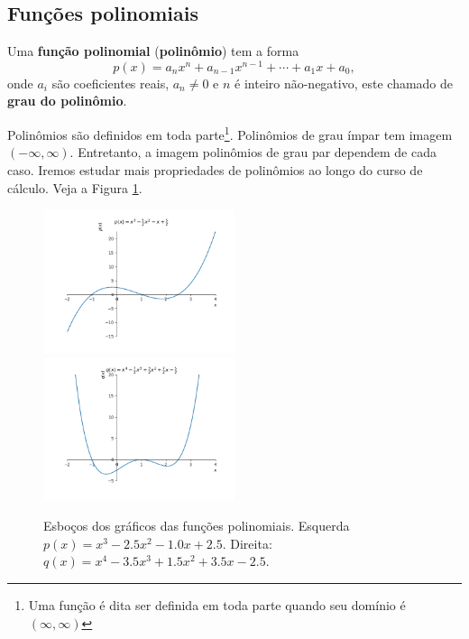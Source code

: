 \subsection{Funções polinomiais}

Uma {\bf função polinomial} ({\bf polinômio}) tem a forma
\begin{equation}
  p(x) = a_nx^n + a_{n-1}x^{n-1} + \cdots + a_1x + a_0,
\end{equation}
onde $a_i$ são coeficientes reais, $a_n\neq 0$ e $n$ é inteiro não-negativo, este chamado de {\bf grau do polinômio}.

Polinômios são definidos em toda parte\footnote{Uma função é dita ser definida em toda parte quando seu domínio é $(\infty, \infty)$}. Polinômios de grau ímpar tem imagem $(-\infty, \infty)$. Entretanto, a imagem polinômios de grau par dependem de cada caso. Iremos estudar mais propriedades de polinômios ao longo do curso de cálculo. Veja a Figura \ref{fig:poli_graficos}.

\begin{figure}[H]
  \centering
  \includegraphics[width=0.5\textwidth]{./cap_funcao/dados/fig_poli_graficos/fig_poli_impar}~
    \includegraphics[width=0.5\textwidth]{./cap_funcao/dados/fig_poli_graficos/fig_poli_par}
  \caption{Esboços dos gráficos das funções polinomiais. Esquerda $p(x) = x^{3} - 2.5 x^{2} - 1.0 x + 2.5$. Direita: $q(x) = x^{4} - 3.5 x^{3} + 1.5 x^{2} + 3.5 x - 2.5$.}
  \label{fig:poli_graficos}
\end{figure}

